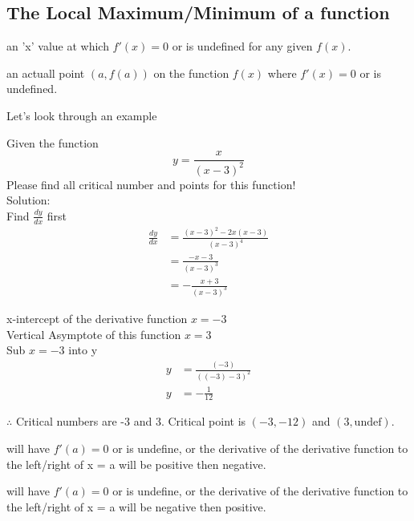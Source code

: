 \subsection{The Local Maximum/Minimum of a function}
\begin{definition}
     an 'x' value at which $f'(x) = 0$ or is undefined for any given $f(x)$.
\end{definition}

\begin{definition}
     an actuall point $(a, f(a))$ on the function $f(x)$ where $f'(x) = 0$ or is undefined. 
\end{definition}

Let's look through an example
\begin{example}
    Given the function $$y = \frac{x}{(x-3)^2}$$ Please find all critical number and points for this function!\\

    \noindent Solution:\\

    \noindent Find $\tfrac{dy}{dx}$ first
    \begin{align}
        \frac{dy}{dx} &= \frac{
            (x - 3)^2 - 2x(x - 3)
        }{(x - 3)^4} \\
        &= \frac{-x - 3}{(x - 3)^3} \\
        &= -\frac{x + 3}{(x - 3)^3}
    \end{align}

    x-intercept of the derivative function $x = -3$\\
    \indent Vertical Asymptote of this function $x = 3$\\

    Sub $x = -3$ into y
    \begin{align*}
        y &= \frac{(-3)}{((-3) - 3)^2}\\
        y &= -\frac{1}{12}
    \end{align*}

    $\therefore$ Critical numbers are -3 and 3. Critical point is $(-3, -12)$ and $(3, \text{undef})$.
\end{example}

\begin{definition}
     will have $f'(a) = 0$ or is undefine, or the derivative of the derivative function to the left/right of x = a will be positive then negative. 
\end{definition}

\begin{definition}
     will have $f'(a) = 0$ or is undefine, or the derivative of the derivative function to the left/right of x = a will be negative then positive. 
\end{definition}

